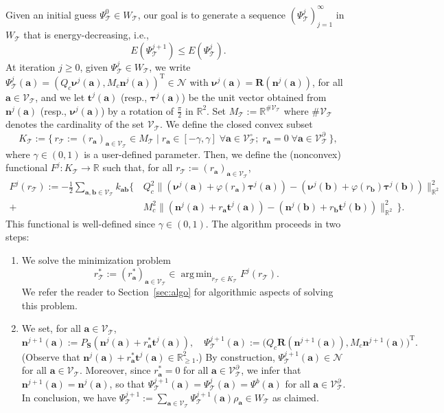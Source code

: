 \documentclass[a4paper,11pt]{article}
\theoremstyle{definition}
\theoremstyle{remark}
\numberwithin{equation}{section}
\newcommand{\disr}{r_\calT}
\newcommand{\disK}{K_\calT}
\newcommand{\disM}{M_\calT}
\newcommand{\Real}{\mathbb{R}}
\newcommand{\ba}{{\boldsymbol a}}
\newcommand{\bb}{{\boldsymbol b}}
\newcommand{\bn}{{\boldsymbol n}}
\newcommand{\bt}{{\boldsymbol t}}
\newcommand{\bR}{{\boldsymbol R}}
\newcommand{\bS}{{\boldsymbol S}}
\newcommand{\bnu}{{\boldsymbol \nu}}
\newcommand{\btau}{{\boldsymbol \tau}}
\newcommand{\calN}{\mathcal{N}}
\newcommand{\calT}{\mathcal{T}}
\newcommand{\calV}{\mathcal{V}}
\newcommand{\tr}{^{\mathrm{T}}}
\DeclareMathOperator*{\argmin}{arg\,min}
\newcommand{\vertex}{\calV_\calT}
\newcommand{\vertexi}{\calV_\calT^\circ}
\newcommand{\vertexb}{\calV_\calT^\partial}
\begin{document}
Given an initial guess $\Psi_\calT^0\in W_\calT$, our goal is to generate a sequence $(\Psi_\calT^j)_{j=1}^\infty$ in $W_\calT$ that is energy-decreasing, i.e.,
\begin{equation} \label{eq:enrg_decr_calT}
E(\Psi_\calT^{j+1}) \le E(\Psi_\calT^{j}).
\end{equation}
At iteration $j\ge0$, given $\Psi_\calT^j\in W_\calT$, 
we write $\Psi_\calT^j(\ba)=(Q_c\bnu^j(\ba),M_c\bn^j(\ba))\tr \in \calN$ with 
$\bnu^j(\ba)=\bR(\bn^j(\ba))$, for all $\ba\in\vertex$, and we let $\bt^j(\ba)$ 
(resp., $\btau^j(\ba)$) be the unit vector obtained from $\bn^j(\ba)$ (resp., 
$\bnu^j(\ba)$) by a rotation of $\frac{\pi}{2}$ in $\Real^2$. Set $\disM:=\Real^{\#\vertex}$
where $\#\vertex$ denotes the cardinality of the set $\vertex$.
We define the closed convex subset 
\begin{equation}\label{equn:aux-space}
\disK := \big\{\, \disr:=(r_{\ba})_{\ba\in\vertex} \in \disM \;|\; r_{\ba} \in [-\gamma,\gamma] \;\forall \ba\in \vertexi; \; r_{\ba}=0 \; \forall \ba \in\vertexb \,\big\}, 
\end{equation}
where $\gamma\in (0,1)$ is a user-defined parameter. Then, we define the (nonconvex) 
functional $F^j : \disK \rightarrow \Real$ such that, for all $\disr:=(r_\ba)_{\ba\in\vertex}$, 
\begin{align}
F^j(\disr) := -\frac12 \sum_{\ba,\bb\in\vertex} k_{\ba\bb} \Big\{ \,
&Q_c^2\|(\bnu^j(\ba)+\varphi(r_{\ba})\btau^j(\ba))-(\bnu^j(\bb)+\varphi(r_{\bb})\btau^j(\bb))\|_{\Real^2}^2 \nonumber \\
+ {} &M_c^2\|(\bn^j(\ba)+r_{\ba}\bt^j(\ba))-(\bn^j(\bb)+r_{\bb}\bt^j(\bb))\|_{\Real^2}^2
\, \Big\}. \label{eq:def_Fj}
\end{align} 
This functional is well-defined since $\gamma\in(0,1)$. 
The algorithm proceeds in two steps:
\begin{enumerate}
\item We solve the minimization problem
\begin{equation}\label{equn: aux-minimization-problem}
\disr^* :=(r^*_{\ba})_{\ba\in\vertex} \in \argmin_{\disr\in \disK} F^j(\disr).
\end{equation}
We refer the reader to Section~\ref{sec:algo} for algorithmic aspects of solving this problem.
\item We set, for all $\ba \in \vertex$,
\begin{equation}\label{equn:coupled-proj}
\bn^{j+1}(\ba):=P_{\bS}(\bn^j(\ba)+r^*_{\ba}\bt^j(\ba)),
\quad
\Psi_\calT^{j+1}(\ba) := \big(Q_c \bR(\bn^{j+1}(\ba)),M_c\bn^{j+1}(\ba)\big)\tr.
\end{equation}
(Observe that $\bn^j(\ba)+r^*_{\ba}\bt^j(\ba)\in \Real^2_{\ge1}$.) 
By construction, $\Psi_\calT^{j+1}(\ba) \in \calN$ for all $\ba \in \vertex$. Moreover, since $r^*_{\ba}=0$ for all $\ba\in\vertexb$, we infer that $\bn^{j+1}(\ba)=\bn^j(\ba)$, so that $\Psi_\calT^{j+1}(\ba) = \Psi_\calT^{j}(\ba) = \Psi^b(\ba)$ for all $\ba \in \vertexb$. In conclusion, we have $\Psi_\calT^{j+1}:=\sum_{\ba\in\vertex} \Psi_\calT^{j+1}(\ba) \rho_{\ba} \in W_\calT$ as claimed.
\end{enumerate}
\end{document}
